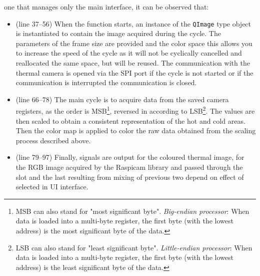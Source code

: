 one that manages only the main interface, it can be observed that:
\begin{itemize}
\item (line 37--56) When the function starts, an instance of the \texttt{QImage}
type object is instantiated to contain the image acquired during the cycle. The
parameters of the frame size are provided and the color space this allows you to
increase the speed of the cycle as it will not be cyclically cancelled and
reallocated the same space, but will be reused. The communication with the thermal
camera is opened via the SPI port if the cycle is not started or if the
communication is interrupted the communication is closed.
%
\item (line 66--78) The main cycle is to acquire data from the saved camera
registers, as the order is MSB\footnote{MSB can also stand for "most significant
byte". \emph{Big-endian processor}: When data is loaded into a multi-byte
register, the first byte (with the lowest address) is the most significant byte
of the data.\cite{56322}}, reversed in according to LSB\footnote{LSB can also
stand for "least significant byte". \emph{Little-endian processor}: When data is
loaded into a multi-byte register, the first byte (with the lowest address) is
the least significant byte of the data.\cite{56322}}. The values are then scaled
to obtain a consistent representation of the hot and cold areas. Then the color
map is applied to color the raw data obtained from the scaling process described
above.
\item (line 79--97) Finally, signals are output for the coloured thermal image,
for the RGB image acquired by the Raspicam library and passed through the slot
and the last resulting from mixing of previous two depend on effect of selected
in UI interface.
\end{itemize}

